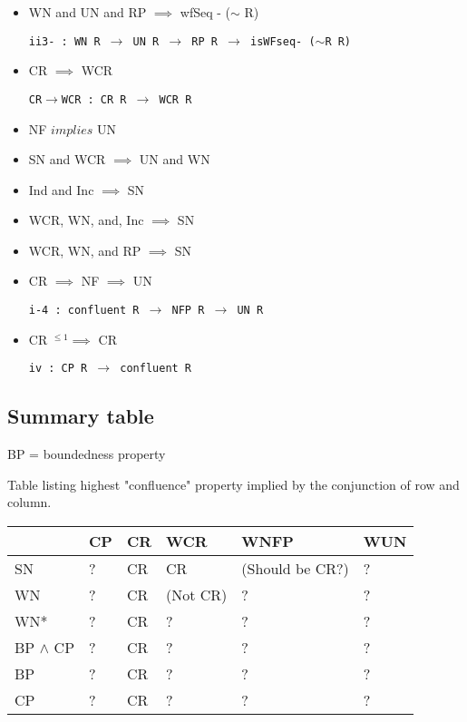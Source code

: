 \documentclass{scrartcl}
\begin{document}
{\begin{itemize}
\texttt{i+ : WN R $\to$ UN$\to$ R $\to$ bounded R}

\item{WN and UN and RP $\implies$ wfSeq - ($\sim$ R)}

\texttt{ii3- :  WN R $\to$ UN R $\to$ RP R $\to$ isWFseq- ($\sim$R R)}

\item {CR $\implies$ WCR}

\texttt{CR$\to$WCR : CR R $\to$ WCR R }

\item {NF $implies$ UN}

\item {SN and WCR $\implies$ UN and WN}
\texttt{}

\item {Ind and Inc $\implies$ SN} 


\item {WCR, WN, and, Inc $\implies$ SN}


\item {WCR, WN, and RP $\implies$ SN}


\item {CR $\implies$ NF $\implies$ UN}

\texttt{i-4 : confluent R $\to$ NFP R $\to$ UN R}

\item {CR $^{\leq1} \implies$ CR}

\texttt{iv : CP R $\to$ confluent R}

\end{itemize}
}

\subsection{Summary table}
BP = boundedness property

Table listing highest "confluence" property implied
by the conjunction of row and column.


\begin{tabular}{@{}l@{\quad}l@{\quad}l@{\quad}l@{\quad}l@{\quad}l@{}}
  \toprule
  & CP & CR & WCR & WNFP & WUN  \\
  \midrule
  SN  & ? & CR & CR & (Should be CR?)  & ?  \\
  WN  & ? & CR & (Not CR) & ? & ? \\
  WN* & ? & CR & ? & ? & ? \\
  BP $\land$ CP & ? & CR & ? & ? & ? \\
  BP  & ? & CR & ? & ? & ? \\
  CP  & ? & CR & ? & ? & ? \\
  \bottomrule
\end{tabular}
\end{document}
